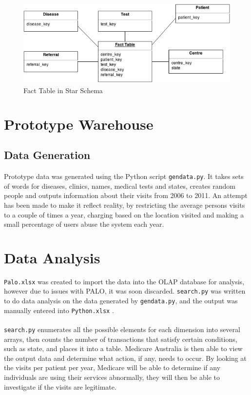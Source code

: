 \documentclass[a4paper,12pt,openbib]{article}
\begin{document}
\begin{figure}[ht!]
	\centering
	\includegraphics[width=15cm]{schema}
	\caption{Fact Table in Star Schema}
	\label{fig:schema}
\end{figure}

\section*{Prototype Warehouse}
\subsection*{Data Generation}
\paragraph{}
	Prototype data was generated using the Python script \texttt{gendata.py}.
	It takes sets of words for diseases, clinics, names, medical tests and states, creates random people and outputs information about their visits from 2006 to 2011.
	An attempt has been made to make it reflect reality, by restricting the average persons visits to a couple of times a year, charging based on the location visited and making a small percentage of users abuse the system each year.

\section*{Data Analysis}
\paragraph{}
	\texttt{Palo.xlsx} was created to import the data into the OLAP database for analysis, however due to issues with PALO, it was soon discarded.
	\texttt{search.py} was written to do data analysis on the data generated by \texttt{gendata.py}, and the output was manually entered into \texttt{Python.xlsx} .
\paragraph{}
	\texttt{search.py} enumerates all the possible elements for each dimension into several arrays, then counts the number of transactions that satisfy certain conditions, such as state, and places it into a table.
	Medicare Australia is then able to view the output data and determine what action, if any, needs to occur.
	By looking at the visits per patient per year, Medicare will be able to determine if any individuals are using their services abnormally, they will then be able to investigate if the visits are legitimate.
\end{document}
